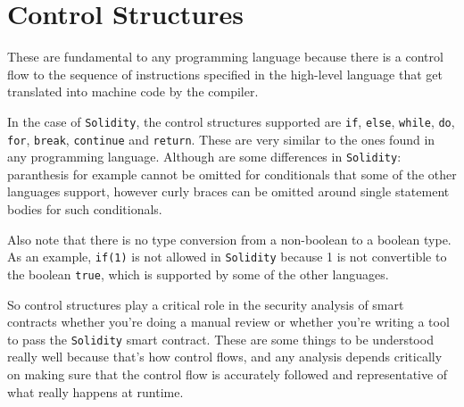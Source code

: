\section{Control Structures}\label{control-structures}

These are fundamental to any programming language because there is a
control flow to the sequence of instructions specified in the high-level
language that get translated into machine code by the compiler.

In the case of \texttt{Solidity}, the control structures supported are
\texttt{if}, \texttt{else}, \texttt{while}, \texttt{do}, \texttt{for},
\texttt{break}, \texttt{continue} and \texttt{return}. These are very
similar to the ones found in any programming language. Although are some
differences in \texttt{Solidity}: paranthesis for example cannot be
omitted for conditionals that some of the other languages support,
however curly braces can be omitted around single statement bodies for
such conditionals.

Also note that there is no type conversion from a non-boolean to a
boolean type. As an example, \texttt{if(1)} is not allowed in
\texttt{Solidity} because 1 is not convertible to the boolean
\texttt{true}, which is supported by some of the other languages.

So control structures play a critical role in the security analysis of
smart contracts whether you're doing a manual review or whether you're
writing a tool to pass the \texttt{Solidity} smart contract. These are
some things to be understood really well because that's how control
flows, and any analysis depends critically on making sure that the
control flow is accurately followed and representative of what really
happens at runtime.
